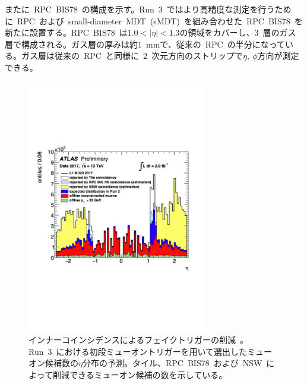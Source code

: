 またに~RPC~BIS78~の構成を示す。Run~3~ではより高精度な測定を行うために~RPC~および~small-diameter~MDT~(sMDT)~を組み合わせた~RPC~BIS78~を新たに設置する。RPC~BIS78~は$1.0<|\eta|<1.3$の領域をカバーし、3~層のガス層で構成される。ガス層の厚みは約1~mmで、従来の~RPC~の半分になっている。ガス層は従来の~RPC~と同様に~2~次元方向のストリップで$\eta,~\phi$方向が測定できる。

\begin{figure}[H]
        \centering   
        \includegraphics[width=0.7\textwidth,page=1]{img/pdf/inner.pdf}
        \caption[インナーコインシデンスによるフェイクトリガーの削減]{インナーコインシデンスによるフェイクトリガーの削減~\cite{shiomi}。Run~3~における初段ミューオントリガーを用いて選出したミューオン候補数の$\eta$分布の予測。タイル、RPC~BIS78~および~NSW~によって削減できるミューオン候補の数を示している。}
        \label{fig:innercoin}
\end{figure}

